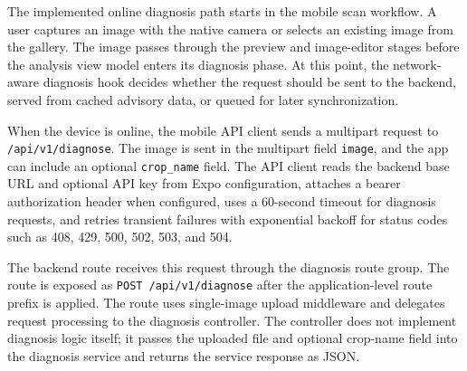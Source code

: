 
The implemented online diagnosis path starts in the mobile scan workflow. A user captures an image
with the native camera or selects an existing image from the gallery. The image passes through the
preview and image-editor stages before the analysis view model enters its diagnosis phase. At this
point, the network-aware diagnosis hook decides whether the request should be sent to the backend,
served from cached advisory data, or queued for later synchronization.

When the device is online, the mobile API client sends a multipart request to
\texttt{/api/v1/diagnose}. The image is sent in the multipart field \texttt{image}, and the app can
include an optional \texttt{crop\_name} field. The API client reads the backend base URL and
optional API key from Expo configuration, attaches a bearer authorization header when configured,
uses a 60-second timeout for diagnosis requests, and retries transient failures with exponential
backoff for status codes such as 408, 429, 500, 502, 503, and 504.

The backend route receives this request through the diagnosis route group. The route is exposed as
\texttt{POST /api/v1/diagnose} after the application-level route prefix is applied. The route uses
single-image upload middleware and delegates request processing to the diagnosis controller. The
controller does not implement diagnosis logic itself; it passes the uploaded file and optional
crop-name field into the diagnosis service and returns the service response as JSON.

